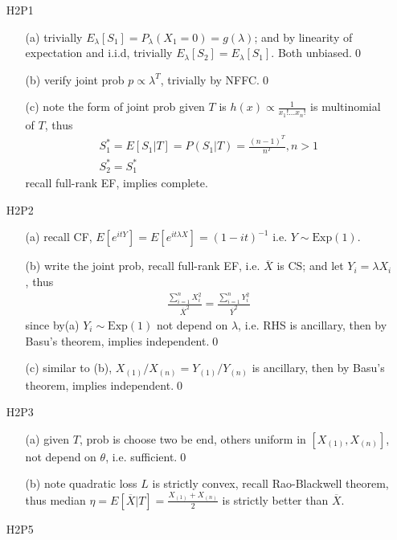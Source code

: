 \documentclass[paper=a4, fontsize=11pt]{scrartcl} %
\numberwithin{equation}{section} %
\numberwithin{figure}{section} %
\numberwithin{table}{section} %
\begin{document}
\begin{itemize}
	\item[H2P1]
	\begin{itemize}
		\item[(a)] trivially $E_\lambda[S_1] = P_\lambda(X_1=0) = g(\lambda)$; and by linearity of expectation and i.i.d, trivially $E_\lambda[S_2]=E_\lambda[S_1]$. Both unbiased.\qed
		\item[(b)] verify joint prob $p\propto \lambda^T$, trivially by NFFC.\qed
		\item[(c)] note the form of joint prob given $T$ is $h(x)\propto \frac{1}{x_1!\dots x_n!}$ is multinomial of $T$, thus
		\begin{align}
			S_1^*= E[S_1|T] = P(S_1|T) = \frac{(n-1)^T}{n^T}, n>1\\
			S_2^*= S_1^*
		\end{align}
		recall full-rank EF, implies complete.
	\end{itemize}
	\item[H2P2]
	\begin{itemize}
		\item[(a)] recall CF, $E[e^{itY}]=E[e^{it\lambda X}]=(1-it)^{-1}$ i.e. $Y\sim \text{Exp}(1)$.
		\item[(b)] write the joint prob, recall full-rank EF, i.e. $\overline{X}$ is CS; and let $Y_i = \lambda X_i$, thus
		\begin{align}
			\frac{\sum_{i=1}^n X_i^2}{\overline{X}^2} = \frac{\sum_{i=1}^n Y_i^2}{\overline{Y}^2}
		\end{align}
		since by(a) $Y_i\sim \text{Exp}(1)$ not depend on $\lambda$, i.e. RHS is ancillary, then by Basu's theorem, implies independent.\qed
		\item[(c)] similar to (b), $X_{(1)}/X_{(n)} = Y_{(1)}/Y_{(n)}$ is ancillary, then by Basu's theorem, implies independent.\qed
	\end{itemize}
	\item[H2P3]
	\begin{itemize}
		\item[(a)] given $T$, prob is choose two be end, others uniform in $[X_{(1)}, X_{(n)}]$, not depend on $\theta$, i.e. sufficient.\qed
		\item[(b)] note quadratic loss $L$ is strictly convex, recall Rao-Blackwell theorem, thus median $\eta = E[\overline{X}|T]=\frac{X_{(1)}+X_{(n)}}{2}$ is strictly better than $\overline{X}$.
	\end{itemize}
	\item[H2P5]
	\begin{itemize}

\end{itemize}
\end{itemize}
\end{document}
